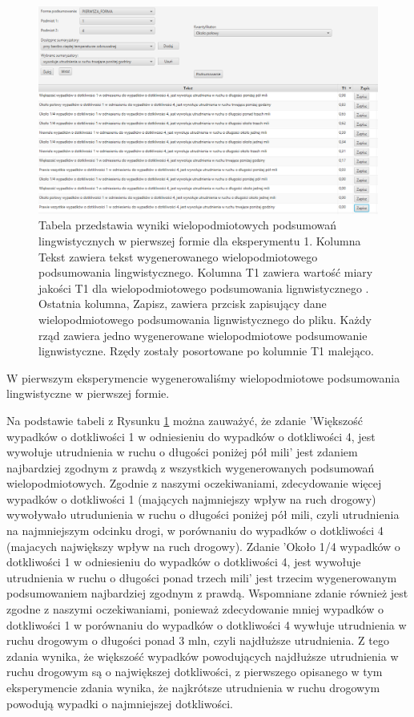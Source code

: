 \documentclass{classrep}
\begin{document}
\begin{figure}[h!]
 \centering
 \includegraphics[width=15cm]{ex_wiel1.png}
 \vspace{-0.3cm}
 \caption{Tabela przedstawia wyniki wielopodmiotowych podsumowań lingwistycznych w pierwszej formie dla eksperymentu 1. Kolumna Tekst zawiera tekst wygenerowanego wielopodmiotowego podsumowania lingwistycznego. Kolumna T1 zawiera wartość miary jakości T1 dla wielopodmiotowego podsumowania lignwistycznego \cite{niewiadomski19}. Ostatnia kolumna, Zapisz, zawiera przcisk zapisujący dane wielopodmiotowego podsumowania lignwistycznego do pliku. Każdy rząd zawiera jedno wygenerowane wielopodmiotowe podsumowanie lignwistyczne. Rzędy zostały posortowane po kolumnie T1 malejąco.  }
 \label{wykr_ex_wiel1}
\end{figure}
\newpage

W pierwszym eksperymencie wygenerowaliśmy wielopodmiotowe podsumowania lingwistyczne w pierwszej formie. 

Na podstawie tabeli z Rysunku \ref{wykr_ex_wiel1} można zauważyć, że zdanie 'Większość wypadków o dotkliwości 1 w odniesieniu do wypadków o dotkliwości 4, jest wywołuje utrudnienia w ruchu o długości poniżej pół mili' jest zdaniem najbardziej zgodnym z prawdą z wszystkich wygenerowanych podsumowań wielopodmiotowych. Zgodnie z naszymi oczekiwaniami, zdecydowanie więcej wypadków o dotkliwości 1 (mających najmniejszy wpływ na ruch drogowy) wywoływało utrudunienia w ruchu o długości poniżej pół mili, czyli utrudnienia na najmniejszym odcinku drogi, w porównaniu do wypadków o dotkliwości 4 (majacych największy wpływ na ruch drogowy).  Zdanie 'Około 1/4 wypadków o dotkliwości 1 w odniesieniu do wypadków o dotkliwości 4, jest wywołuje utrudnienia w ruchu o długości ponad trzech mili' jest trzecim wygenerowanym podsumowaniem najbardziej zgodnym z prawdą. Wspomniane zdanie również jest zgodne z naszymi oczekiwaniami, ponieważ zdecydowanie mniej wypadków o dotkliwości 1  w porównaniu do wypadków o dotkliwości 4 wywłuje utrudnienia w ruchu drogowym o długości ponad 3 mln, czyli najdłuższe utrudnienia. Z tego zdania wynika, że większość wypadków powodujących najdłuższe utrudnienia w ruchu drogowym są o największej dotkliwości, z pierwszego opisanego w tym eksperymencie zdania wynika, że najkrótsze utrudnienia w ruchu drogowym powodują wypadki o najmniejszej dotkliwości. 
\end{document}
